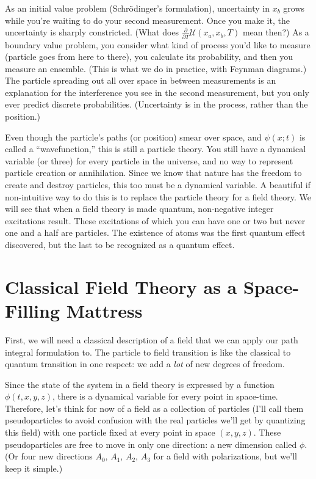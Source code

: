 \documentclass[12pt]{article}
\begin{document}
As an initial value problem (Schr\"odinger's formulation), uncertainty
in $x_b$ grows while you're waiting to do your second measurement.
Once you make it, the uncertainty is sharply constricted.  (What does
$\frac{\partial}{\partial T} \mathcal{U}(x_a, x_b, T)$ mean then?)  As
a boundary value problem, you consider what kind of process you'd like
to measure (particle goes from here to there), you calculate its
probability, and then you measure an ensemble.  (This is what we do in
practice, with Feynman diagrams.)  The particle spreading out all over
space in between measurements is an explanation for the interference
you see in the second measurement, but you only ever predict discrete
probabilities.  (Uncertainty is in the process, rather than the
position.)

Even though the particle's paths (or position) smear over space, and
$\psi(x;t)$ is called a ``wavefunction,'' this is still a particle
theory.  You still have a dynamical variable (or three) for every
particle in the universe, and no way to represent particle creation or
annihilation.  Since we know that nature has the freedom to create and
destroy particles, this too must be a dynamical variable.  A beautiful
if non-intuitive way to do this is to replace the particle theory for
a field theory.  We will see that when a field theory is made quantum,
non-negative integer excitations result.  These excitations of which
you can have one or two but never one and a half are particles.  The
existence of atoms was the first quantum effect discovered, but the
last to be recognized as a quantum effect.

\section{Classical Field Theory as a Space-Filling Mattress}

First, we will need a classical description of a field that we can
apply our path integral formulation to.  The particle to field
transition is like the classical to quantum transition in one respect:
we add a {\it lot} of new degrees of freedom.

Since the state of the system in a field theory is expressed by a
function $\phi(t,x,y,z)$, there is a dynamical variable for every
point in space-time.  Therefore, let's think for now of a field as a
collection of particles (I'll call them pseudoparticles to avoid
confusion with the real particles we'll get by quantizing this field)
with one particle fixed at every point in space $(x,y,z)$.  These
pseudoparticles are free to move in only one direction: a new
dimension called $\phi$.  (Or four new directions $A_0$, $A_1$, $A_2$,
$A_3$ for a field with polarizations, but we'll keep it simple.)
\end{document}

